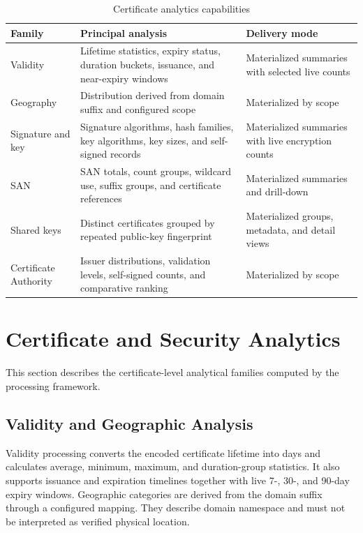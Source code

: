 \renewcommand{\arraystretch}{1.3}

\begin{table}[H]
  \centering
  \small
  \setlength{\tabcolsep}{4pt}
  \caption{Certificate analytics capabilities}
  \label{tab:analytics-family-contracts}
  \begin{tabularx}{\textwidth}{@{}>{\RaggedRight\arraybackslash}p{}Y>{\RaggedRight\arraybackslash}p{0.25\textwidth}@{}}
    \toprule
    \textbf{Family} & \textbf{Principal analysis} & \textbf{Delivery mode} \\
    \midrule
    Validity & Lifetime statistics, expiry status, duration buckets, issuance, and near-expiry windows & Materialized summaries with selected live counts \\
    Geography & Distribution derived from domain suffix and configured scope & Materialized by scope \\
    Signature and key & Signature algorithms, hash families, key algorithms, key sizes, and self-signed records & Materialized summaries with live encryption counts \\
    SAN & SAN totals, count groups, wildcard use, suffix groups, and certificate references & Materialized summaries and drill-down \\
    Shared keys & Distinct certificates grouped by repeated public-key fingerprint & Materialized groups, metadata, and detail views \\
    Certificate Authority & Issuer distributions, validation levels, self-signed counts, and comparative ranking & Materialized by scope \\
    \bottomrule
  \end{tabularx}
\end{table}

\renewcommand{\arraystretch}{1}

\section{Certificate and Security Analytics}
\label{sec:cert-analytics}

This section describes the certificate-level analytical families computed by
the processing framework.

\subsection{Validity and Geographic Analysis}

Validity processing converts the encoded certificate lifetime into days and
calculates average, minimum, maximum, and duration-group statistics. It also
supports issuance and expiration timelines together with live 7-, 30-, and
90-day expiry windows. Geographic categories are derived from the domain
suffix through a configured mapping. They describe domain namespace and must
not be interpreted as verified physical location.

